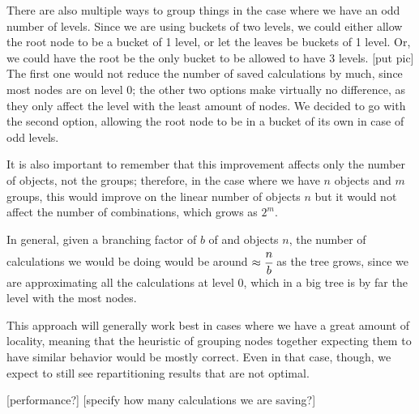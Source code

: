 There are also multiple ways to group things in the case where we have an odd number of levels. Since we are using buckets of two levels, we could either allow the root node to be a bucket of 1 level, or let the leaves be buckets of 1 level. Or, we could have the root be the only bucket to be allowed to have 3 levels. [put pic] The first one would not reduce the number of saved calculations by much, since most nodes are on level 0; the other two options make virtually no difference, as they only affect the level with the least amount of nodes. We decided to go with the second option, allowing the root node to be in a bucket of its own in case of odd levels.

It is also important to remember that this improvement affects only the number of objects, not the groups; therefore, in the case where we have $n$ objects and $m$ groups, this would improve on the linear number of objects $n$ but it would not affect the number of combinations, which grows as $2^m$.

In general, given a branching factor of $b$ of and objects $n$, the number of calculations we would be doing would be around $\approx\cfrac{n}{b}$ as the tree grows, since we are approximating all the calculations at level 0, which in a big tree is by far the level with the most nodes.

This approach will generally work best in cases where we have a great amount of locality, meaning that the heuristic of grouping nodes together expecting them to have similar behavior would be mostly correct. Even in that case, though, we expect to still see repartitioning results that are not optimal.

[performance?]
[specify how many calculations we are saving?]

